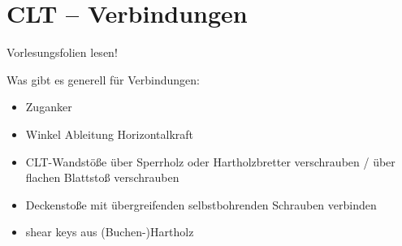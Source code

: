 \documentclass[fleqn,twoside]{article}
\begin{document}
\section{CLT – Verbindungen}

Vorlesungsfolien lesen!\vspace{3mm}

Was gibt es generell für Verbindungen:
    \begin{itemize}
        \item Zuganker
        \item Winkel Ableitung Horizontalkraft
        \item CLT-Wandstöße über Sperrholz oder Hartholzbretter verschrauben / über flachen Blattstoß verschrauben
        \item Deckenstoße mit übergreifenden selbstbohrenden Schrauben verbinden 
        \item shear keys aus (Buchen-)Hartholz
    \end{itemize}
\end{document}
